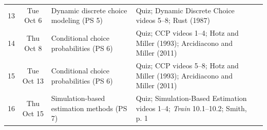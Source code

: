 \documentclass[11pt,english]{article}
\begin{document}
\begin{landscape}
\begin{center}
\begin{tabular}{cc>{\raggedright}m{5.5cm}>{\raggedright}m{7.5cm}>{\raggedright}m{3.5cm}}
13 & Tue Oct 6  & Dynamic discrete choice modeling (PS 5)             & Quiz; Dynamic Discrete Choice videos 5--8; Rust (1987)                             &  \tabularnewline
14 & Thu Oct 8  & Conditional choice probabilities (PS 6)             & Quiz; CCP videos 1--4; Hotz and Miller (1993); Arcidiacono and Miller (2011)       &  \tabularnewline
15 & Tue Oct 13 & Conditional choice probabilities (PS 6)             & Quiz; CCP videos 5--8; Hotz and Miller (1993); Arcidiacono and Miller (2011)       &  \tabularnewline
16 & Thu Oct 15 & Simulation-based estimation methods (PS 7)          & Quiz; Simulation-Based Estimation videos 1--4; \emph{Train} 10.1--10.2; Smith, p. 1 &  \tabularnewline
\bottomrule
\end{tabular}
\par\end{center}
\end{landscape}
\end{document}
